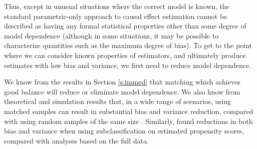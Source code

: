 \documentclass[11pt,titlepage]{article}
\begin{document}
Thus, except in unusual situations where the correct model is known,
the standard parametric-only approach to causal effect estimation
cannot be described as having any formal statistical properties other
than some degree of model dependence (although in some situations, it
may be possible to characterize quantities such as the maximum degree
of bias).  To get to the point where we can consider known
properties of estimators, and ultimately produce estimates with low
bias and variance, we first need to reduce model dependence.


We know from the results in Section \ref{s:immed} that matching which
achieves good balance will reduce or eliminate model dependence.  We
also know from theoretical and simulation results that, in a wide
range of scenarios, using matched samples can result in substantial
bias and variance reduction, compared with using random samples of the
same size \citep{RubTho92, RubTho96}.  Similarly, \cite{ImaDyk04}
found reductions in both bias and variance when using
subclassification on estimated propensity scores, compared with
analyses based on the full data.
\end{document}
